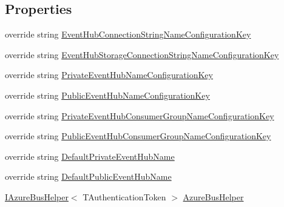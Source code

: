 \subsection*{Properties}
\begin{DoxyCompactItemize}
\item 
override string \hyperlink{classCqrs_1_1Azure_1_1ServiceBus_1_1AzureEventHubBus_a4ab2143b01ac269db357fa9dff613a4a_a4ab2143b01ac269db357fa9dff613a4a}{Event\+Hub\+Connection\+String\+Name\+Configuration\+Key}
\item 
override string \hyperlink{classCqrs_1_1Azure_1_1ServiceBus_1_1AzureEventHubBus_a56af12dd26c6a34ba444dcc8b0110337_a56af12dd26c6a34ba444dcc8b0110337}{Event\+Hub\+Storage\+Connection\+String\+Name\+Configuration\+Key}
\item 
override string \hyperlink{classCqrs_1_1Azure_1_1ServiceBus_1_1AzureEventHubBus_a2ad236850ff85bdb8dcc252af7b123c7_a2ad236850ff85bdb8dcc252af7b123c7}{Private\+Event\+Hub\+Name\+Configuration\+Key}
\item 
override string \hyperlink{classCqrs_1_1Azure_1_1ServiceBus_1_1AzureEventHubBus_afd3a436ec413b208d201dab7750f8f9e_afd3a436ec413b208d201dab7750f8f9e}{Public\+Event\+Hub\+Name\+Configuration\+Key}
\item 
override string \hyperlink{classCqrs_1_1Azure_1_1ServiceBus_1_1AzureEventHubBus_a2ef9980a763a789179a009d6e0972175_a2ef9980a763a789179a009d6e0972175}{Private\+Event\+Hub\+Consumer\+Group\+Name\+Configuration\+Key}
\item 
override string \hyperlink{classCqrs_1_1Azure_1_1ServiceBus_1_1AzureEventHubBus_a5e03e9ddac66cf136bde75e40fc11afc_a5e03e9ddac66cf136bde75e40fc11afc}{Public\+Event\+Hub\+Consumer\+Group\+Name\+Configuration\+Key}
\item 
override string \hyperlink{classCqrs_1_1Azure_1_1ServiceBus_1_1AzureEventHubBus_a8903cb16fa7bfc2396f249c48fe42a60_a8903cb16fa7bfc2396f249c48fe42a60}{Default\+Private\+Event\+Hub\+Name}
\item 
override string \hyperlink{classCqrs_1_1Azure_1_1ServiceBus_1_1AzureEventHubBus_a0d3aa3a2e36b52d131039955700955cb_a0d3aa3a2e36b52d131039955700955cb}{Default\+Public\+Event\+Hub\+Name}
\item 
\hyperlink{interfaceCqrs_1_1Azure_1_1ServiceBus_1_1IAzureBusHelper}{I\+Azure\+Bus\+Helper}$<$ T\+Authentication\+Token $>$ \hyperlink{classCqrs_1_1Azure_1_1ServiceBus_1_1AzureEventHubBus_ac70c513a41f42208cc3332d4ed855af8_ac70c513a41f42208cc3332d4ed855af8}{Azure\+Bus\+Helper}
\end{DoxyCompactItemize}
